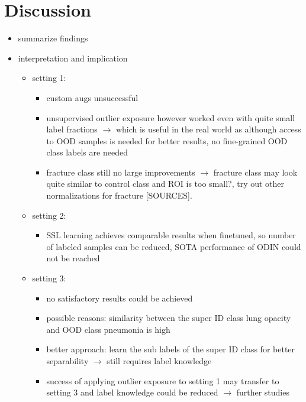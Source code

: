 \section{Discussion}
\begin{itemize}
    \item summarize findings
    \item interpretation and implication
        \begin{itemize}
            \item setting 1: 
                \begin{itemize}
                    \item custom augs unsuccessful
                    \item unsupervised outlier exposure however worked even with quite small label fractions $\rightarrow$ which is useful in the real world as although access to OOD samples is needed for better results, no fine-grained OOD class labels are needed
                    \item fracture class still no large improvements $\rightarrow$ fracture class may look quite similar to control class and ROI is too small?, try out other normalizations for fracture [SOURCES].
                \end{itemize} 
        \item setting 2: 
            \begin{itemize}
                \item SSL learning achieves comparable results when finetuned, so number of labeled samples can be reduced, SOTA performance of ODIN could not be reached
            \end{itemize}
        \item setting 3: 
                \begin{itemize}
                    \item no satisfactory results could be achieved
                    \item possible reasons: similarity between the super ID class lung opacity and OOD class pneumonia is high
                    \item better approach: learn the sub labels of the super ID class for better separability $\rightarrow$ still requires label knowledge
                    \item success of applying outlier exposure to setting 1 may transfer to setting 3 and label knowledge could be reduced $\rightarrow$ further studies
                \end{itemize}

\end{itemize}
\end{itemize}
